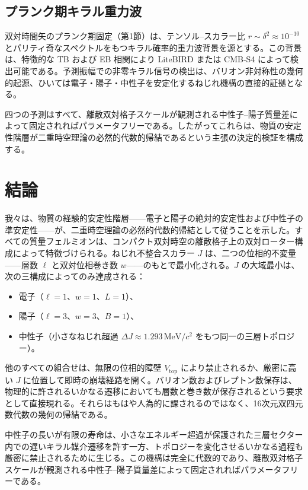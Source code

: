 \documentclass[dvipdfmx,a4paper]{article}
\begin{document}
\subsection{プランク期キラル重力波}

双対時間矢のプランク期固定（第1節）は、テンソル--スカラー比 \(r \sim \delta^2 \approx 10^{-10}\) とパリティ奇なスペクトルをもつキラル確率的重力波背景を源とする。この背景は、特徴的な TB および EB 相関により LiteBIRD または CMB-S4 によって検出可能である。予測振幅での非零キラル信号の検出は、バリオン非対称性の幾何的起源、ひいては電子・陽子・中性子を安定化するねじれ機構の直接的証拠となる。

四つの予測はすべて、離散双対格子スケールが観測される中性子--陽子質量差によって固定されればパラメータフリーである。したがってこれらは、物質の安定性階層が二重時空理論の必然的代数的帰結であるという主張の決定的検証を構成する。

\section{結論}

我々は、物質の経験的安定性階層——電子と陽子の絶対的安定性および中性子の準安定性——が、二重時空理論の必然的代数的帰結として従うことを示した。すべての質量フェルミオンは、コンパクト双対時空の離散格子上の双対ローター構成によって特徴づけられる。ねじれ不整合スカラー \(J\) は、二つの位相的不変量——層数 \(\ell\) と双対位相巻き数 \(w\)——のもとで最小化される。\(J\) の大域最小は、次の三構成によってのみ達成される：

\begin{itemize}
\item 電子（\(\ell=1\)、\(w=1\)、\(L=1\)）、
\item 陽子（\(\ell=3\)、\(w=3\)、\(B=1\)）、
\item 中性子（小さなねじれ超過 \(\Delta J \approx 1.293\,\mathrm{MeV}/c^2\) をもつ同一の三層トポロジー）。
\end{itemize}

他のすべての組合せは、無限の位相的障壁 \(V_\text{top}\) により禁止されるか、厳密に高い \(J\) に位置して即時の崩壊経路を開く。バリオン数およびレプトン数保存は、物理的に許されるいかなる遷移においても層数と巻き数が保存されるという要求として直接現れる。それらはもはや人為的に課されるのではなく、16次元双四元数代数の幾何の帰結である。

中性子の長いが有限の寿命は、小さなエネルギー超過が保護された三層セクター内での遅いキラル媒介遷移を許す一方、トポロジーを変化させるいかなる過程も厳密に禁止されるために生じる。この機構は完全に代数的であり、離散双対格子スケールが観測される中性子--陽子質量差によって固定されればパラメータフリーである。
\end{document}
